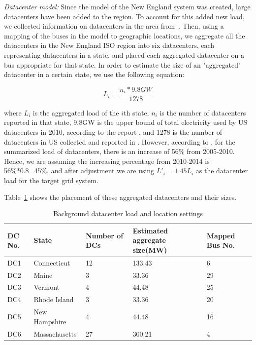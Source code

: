 {\em Datacenter model:} Since the model of the New England system was created, large datacenters have been added to the region.  To account for this added new load, we collected information on datacenters in the area from~\cite{DCmap}.  Then, using a mapping of the buses in the model to geographic locations, we aggregate all the datacenters in the New England ISO region into six datacenters, each representing datacenters in a state, and placed each aggregated datacenter on a bus appropriate for that state. In order to estimate the size of an "aggregated" datacenter in a certain state, we use the following equation:

\begin{equation}
L_i=\frac{n_i*9.8GW}{1278}
\end{equation}

\noindent where $L_i$ is the aggregated load of the $i$th state, $n_i$ is the number of datacenters reported in that state,  9.8GW is the upper bound of total electricity used by US datacenters in 2010, according to the report \cite{Koomey2011}, and 1278 is the number of datacenters in US collected and reported in \cite{DCmap}. However, according to \cite{Koomey2011}, for the summarized load of datacenters, there is an increase of 56\% from 2005-2010. Hence, we are assuming the increasing percentage from 2010-2014 is 56\%*0.8=45\%, and after adjustment we are using $L'_i=1.45L_i$ as the datacenter load for the target grid system.

Table~\ref{tab:dc_setting} shows the placement of these aggregated datacenters and their sizes.

\begin{table}[ht]
\begin{center}
\caption{Background datacenter load and location settings}
\begin{tabular}{|l|l|p{30pt}|p{50pt}|p{30pt}|}
\hline
DC No. & State & Number of DCs & Estimated  aggregate size(MW) & Mapped Bus No.\\
\hline
DC1 & Connecticut & 12 &133.43 & 6\\
DC2 & Maine & 3 &33.36 & 29 \\
DC3 & Vermont & 4 &44.48 & 25 \\
DC4 & Rhode Island & 3 &33.36 & 20\\
DC5 & New Hampshire & 4& 44.48 & 16\\
DC6 & Massachusetts & 27& 300.21 & 4 \\
\hline

\end{tabular}
   \vspace{.05in}
\label{tab:dc_setting}
\end{center}
\end{table}


